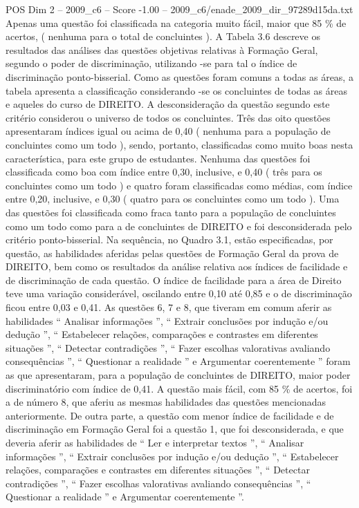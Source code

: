 \begin{textsample}{POS Dim 2 – 2009\_c6 – Score -1.00 – 2009\_c6/enade\_2009\_dir\_97289d15da.txt}
Apenas uma questão foi classificada na categoria muito fácil, maior que 85 \% de acertos, ( nenhuma para o total de concluintes ).
A Tabela 3.6 descreve os resultados das análises das questões objetivas relativas à Formação Geral, segundo o poder de discriminação, utilizando -se para tal o índice de discriminação ponto-bisserial.
Como as questões foram comuns a todas as áreas, a tabela apresenta a classificação considerando -se os concluintes de todas as áreas e aqueles do curso de DIREITO.
A desconsideração da questão segundo este critério considerou o universo de todos os concluintes.
Três das oito questões apresentaram índices igual ou acima de 0,40 ( nenhuma para a população de concluintes como um todo ), sendo, portanto, classificadas como muito boas nesta característica, para este grupo de estudantes.
Nenhuma das questões foi classificada como boa com índice entre 0,30, inclusive, e 0,40 ( três para os concluintes como um todo ) e quatro foram classificadas como médias, com índice entre 0,20, inclusive, e 0,30 ( quatro para os concluintes como um todo ).
Uma das questões foi classificada como fraca tanto para a população de concluintes como um todo como para a de concluintes de DIREITO e foi desconsiderada pelo critério ponto-bisserial.
Na sequência, no Quadro 3.1, estão especificadas, por questão, as habilidades aferidas pelas questões de Formação Geral da prova de DIREITO, bem como os resultados da análise relativa aos índices de facilidade e de discriminação de cada questão.
O índice de facilidade para a área de Direito teve uma variação considerável, oscilando entre 0,10 até 0,85 e o de discriminação ficou entre 0,03 e 0,41.
As questões 6, 7 e 8, que tiveram em comum aferir as habilidades “ Analisar informações ”, “ Extrair conclusões por indução e/ou dedução ”, “ Estabelecer relações, comparações e contrastes em diferentes situações ”, “ Detectar contradições ”, “ Fazer escolhas valorativas avaliando consequências ”, “ Questionar a realidade ” e Argumentar coerentemente ” foram as que apresentaram, para a população de concluintes de DIREITO, maior poder discriminatório com índice de 0,41.
A questão mais fácil, com 85 \% de acertos, foi a de número 8, que aferiu as mesmas habilidades das questões mencionadas anteriormente.
De outra parte, a questão com menor índice de facilidade e de discriminação em Formação Geral foi a questão 1, que foi desconsiderada, e que deveria aferir as habilidades de “ Ler e interpretar textos ”, “ Analisar informações ”, “ Extrair conclusões por indução e/ou dedução ”, “ Estabelecer relações, comparações e contrastes em diferentes situações ”, “ Detectar contradições ”, “ Fazer escolhas valorativas avaliando consequências ”, “ Questionar a realidade ” e Argumentar coerentemente ”.

\end{textsample}
